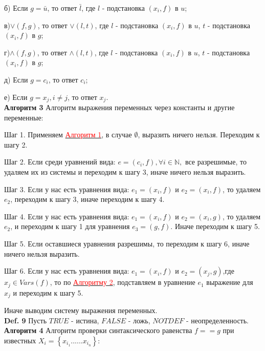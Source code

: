 \documentclass[12pt]{article}
\begin{document}
    б) Если $g = \bar{u}$, то ответ $\bar{l}$, где $l$ - подстановка $ (x_{i},f) $ в $u$;
    
    в)$\vee (f, g)$, то ответ $\vee(l,t)$, где $l$ - подстановка $ (x_{i},f) $ в $u$,  $t$ - подстановка $ (x_{i},f) $ в $g$;
    
    г)$\wedge (f, g)$, то ответ $\wedge(l,t)$, где $l$ - подстановка $ (x_{i},f) $ в $u$, $t$ - подстановка $ (x_{i},f) $ в $g$;
    
    д) Если $g = c_{i}$, то ответ $c_{i}$;
    
    е) Если $g = x_{j}, i \neq j$, то ответ $x_{j}$.
     \\
     
      \hypertarget{a3}{{\bf Алгоритм 3}} Алгоритм выражения переменных через константы и другие переменные:
     
     Шаг 1. Применяем \hyperlink{a1}{ \textcolor{red} {Алгоритм 1}}, в случае  $   \emptyset $, выразить ничего нельзя. Переходим к шагу 2.
     
     Шаг 2. Если среди уравнений вида: $e =(c_{i},f), \forall i \in \mathbb{N},$ все разрешимые, то удаляем  их из системы и переходим к шагу 3, иначе ничего нельзя выразить.
     
     
     Шаг 3. Если у нас есть уравнения вида: $e_{1} =(x_{i},f)$ и $e_{2} =(x_{i},f)$, то удаляем $e_{2}$, переходим к шагу 3, иначе переходим к шагу 4.
     
     Шаг 4. Если у нас есть уравнения вида: $e_{1} =(x_{i},f)$ и $e_{2} =(x_{i},g)$, то удаляем $e_{2}$, и переходим к  шагу 1 для  уравнения   $e_{3} =(g,f)$. Иначе переходим к шагу 5.
     
     Шаг 5. Если оставшиеся уравнения разрешимы, то переходим к шагу 6, иначе ничего нельзя выразить.
     
     Шаг 6. Если у нас есть уравнения вида: $e_{1} =(x_{i},f)$ и $e_{2} =(x_{j},g)$,где $x_{j} \in Vars(f)$, то по \hyperlink{a2}{ \textcolor{red}{Алгоритму 2}}, подставляем в уравнение $e_{1}$ выражение для $x_{j}$ и переходим к шагу 5. 
     
     Иначе выводим систему выражения переменных. 
     \\
     
     {\bf Def. 9} Пусть $TRUE$ - истина, $FALSE$ - ложь, $NOTDEF$ - неопределенность.
     \\
     
     \hypertarget{a4}{{\bf Алгоритм 4}} Алгоритм проверки синтаксического равенства $f == g $ при известных $ X_{i} = \left\lbrace x_{i_{1}} ......x_{i_{n}}\right\rbrace $: 
     
\end{document}
